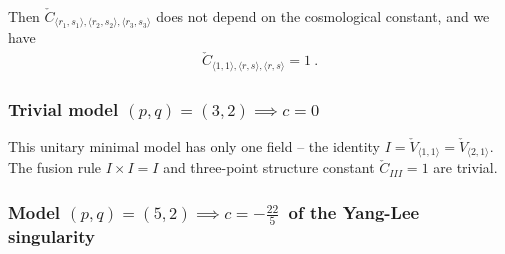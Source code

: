 \documentclass[12pt, a4paper, notitlepage, twoside]{report}
\numberwithin{equation}{section}
\theoremstyle{break}
\begin{document}
Then $\check{C}_{\langle r_1,s_1\rangle ,\langle r_2,s_2\rangle ,\langle r_3,s_3 \rangle}$ does not depend on the cosmological constant, and we have 
\begin{align}
\boxed{ \check{C}_{\langle 1,1\rangle , \langle r,s \rangle,\langle r,s \rangle}=1}\ .
\end{align}


\subsubsection{Trivial model $(p,q)=(3,2) \implies c = 0$}

This unitary minimal model has only one field -- the identity $I=\check{V}_{\langle 1,1 \rangle}=\check{V}_{\langle 2,1 \rangle}$.
The fusion rule $I\times I = I$ and three-point structure constant $\check{C}_{III} = 1$ are trivial.

\subsubsection{Model $(p,q)=(5,2) \implies c=-\tfrac{22}{5}$\ of the Yang-Lee singularity}
\end{document}
